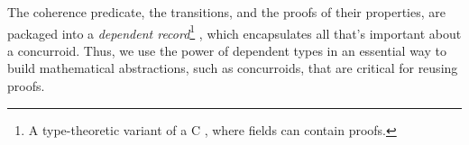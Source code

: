 
The coherence predicate, the transitions, and the proofs of their
properties, are packaged into a \emph{dependent record}\footnote{A
  type-theoretic variant of a C , where fields can
  contain proofs.} , which encapsulates all that's
important about a concurroid. Thus, we use the power of dependent
types in an essential way to build mathematical abstractions, such as
concurroids, that are critical for reusing proofs.
%



